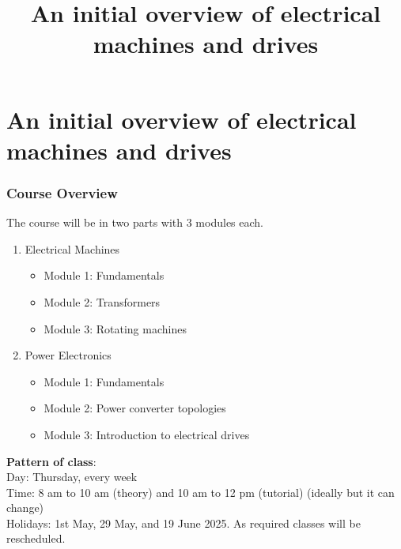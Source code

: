 \section{An initial overview of electrical machines and drives}
\title[Initial overview]{An initial overview of electrical machines and drives}
 
\begin{frame}[plain]
    \titlepage
\end{frame}
\begin{frame}
	\frametitle{Course Overview}
The course will be in two parts with 3 modules each.
		\begin{enumerate}
		  \item Electrical Machines
            \begin{itemize}
            	\item<1-> Module 1: Fundamentals
            	\item<2-> Module 2: Transformers
            	\item<3-> Module 3: Rotating machines
            \end{itemize}
		  \item Power Electronics
            \begin{itemize}
            	\item<1-> Module 1: Fundamentals
            	\item<2-> Module 2: Power converter topologies
            	\item<3-> Module 3: Introduction to electrical drives
            \end{itemize}
		\end{enumerate}
\textbf{Pattern of class}: \\ Day: Thursday, every week \\ Time: 8 am to 10 am (theory) and 10 am to 12 pm (tutorial) (ideally but it can change) \\ Holidays: 1st May, 29 May, and 19 June 2025. As required classes will be rescheduled. 
\end{frame}

